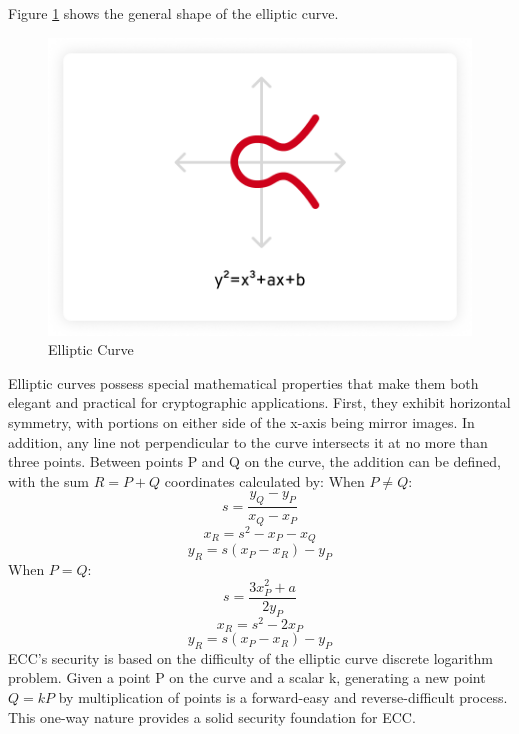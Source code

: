 \documentclass[9pt,a4paper,twoside]{rho-class/rho}
\begin{document}
        Figure \ref{fig:2} shows the general shape of the elliptic curve.
        \begin{figure}[H]
            \centering
            \includegraphics[width=\linewidth]{figures/image-1-1.png}
            \caption{Elliptic Curve}
            \label{fig:2}
        \end{figure}
Elliptic curves \cite{Recommendersteam} possess special mathematical properties that make them both elegant and practical for cryptographic applications. First, they exhibit horizontal symmetry, with portions on either side of the x-axis being mirror images. In addition, any line not perpendicular to the curve intersects it at no more than three points. Between points P and Q on the curve, the addition can be defined, with the sum $R = P + Q$ coordinates calculated by:
When $P \neq Q$:
$$ s = \frac{y_Q - y_P}{x_Q - x_P} $$
$$ x_R = s^2 - x_P - x_Q $$
$$ y_R = s(x_P - x_R) - y_P $$
When $P = Q$:
$$ s = \frac{3x_P^2 + a}{2y_P} $$
$$ x_R = s^2 - 2x_P $$
$$ y_R = s(x_P - x_R) - y_P $$
ECC's security is based on the difficulty of the elliptic curve discrete logarithm problem. Given a point P on the curve and a scalar k, generating a new point $Q = kP$ by multiplication of points is a forward-easy and reverse-difficult process. This one-way nature provides a solid security foundation for ECC.
\end{document}
